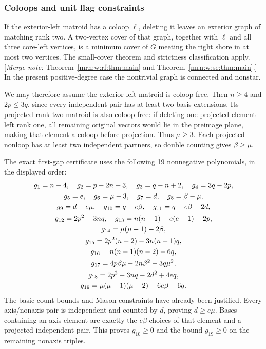 \documentclass[11pt,a4paper]{article}
\theoremstyle{remark}\newtheorem{remark}[theorem]{Remark}
\newcommand{\mnote}[1]{[\textit{Merge note:} #1]}
\begin{document}
\subsubsection{Coloops and unit flag constraints}
If the exterior-left matroid has a coloop $\ell$, deleting it leaves an exterior graph of matching rank two. A two-vertex cover of that graph, together with $\ell$ and all three core-left vertices, is a minimum cover of $G$ meeting the right shore in at most two vertices. The small-cover theorem \cite{b:m74} and strictness classification \cite{b:m72} apply. \mnote{Theorem~\ref{mrn:w:rf:thm:main} and Theorem~\ref{mrn:w:se:thm:main}.} In the present positive-degree case the nontrivial graph is connected and nonstar.

We may therefore assume the exterior-left matroid is coloop-free. Then $n\ge4$ and $2p\le3q$, since every independent pair has at least two basis extensions. Its projected rank-two matroid is also coloop-free: if deleting one projected element left rank one, all remaining original vectors would lie in the preimage plane, making that element a coloop before projection. Thus $\mu\ge3$. Each projected nonloop has at least two independent partners, so double counting gives $\beta\ge\mu$.

The exact first-gap certificate uses the following 19 nonnegative polynomials, in the displayed order:
\begin{gather}
 g_1=n-4,\quad g_2=p-2n+3,\quad g_3=q-n+2,\quad g_4=3q-2p,\notag\\
 g_5=e,\quad g_6=\mu-3,\quad g_7=d,\quad g_8=\beta-\mu,\notag\\
 g_9=d-e\mu,\quad g_{10}=q-e\beta,\quad
 g_{11}=q+e\beta-2d,\label{mrn:e:tr:eq:constraints}\\
 g_{12}=2p^2-3nq,\quad
 g_{13}=n(n-1)-e(e-1)-2p,\notag\\
 g_{14}=\mu(\mu-1)-2\beta,\notag\\
 g_{15}=2p^2(n-2)-3n(n-1)q,\notag\\
 g_{16}=n(n-1)(n-2)-6q,\notag\\
 g_{17}=4p\beta\mu-2n\beta^2-3q\mu^2,\notag\\
 g_{18}=2p^2-3nq-2d^2+4eq,\notag\\
 g_{19}=\mu(\mu-1)(\mu-2)+6e\beta-6q.\notag
\end{gather}
The basic count bounds and Mason constraints have already been justified. Every axis/nonaxis pair is independent and counted by $d$, proving $d\ge e\mu$. Bases containing an axis element are exactly the $e\beta$ choices of that element and a projected independent pair. This proves $g_{10}\ge0$ and the bound $g_{19}\ge0$ on the remaining nonaxis triples.
\end{document}
